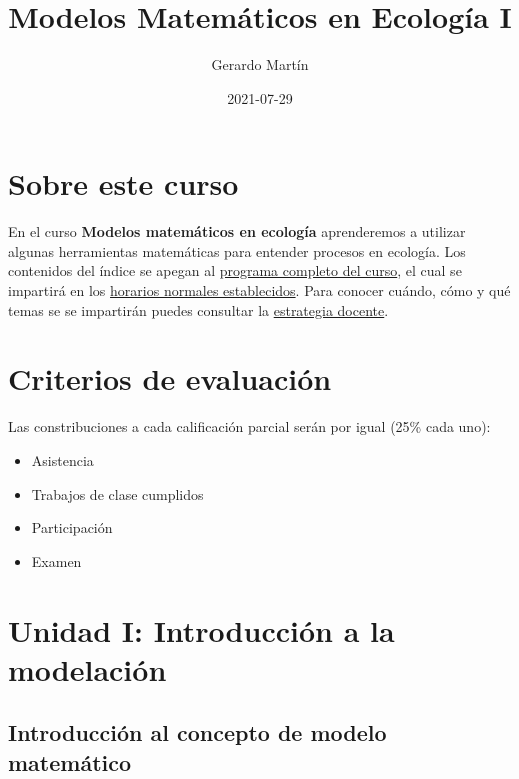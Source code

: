 \documentclass[
]{book}
\title{Modelos Matemáticos en Ecología I}
\author{Gerardo Martín}
\date{2021-07-29}
\providecommand{\tightlist}{%
  \setlength{\itemsep}{0pt}\setlength{\parskip}{0pt}}
\begin{document}
\maketitle

{
\setcounter{tocdepth}{1}
\tableofcontents
}
\hypertarget{sobre-este-curso}{%
\chapter{Sobre este curso}\label{sobre-este-curso}}

En el curso \textbf{Modelos matemáticos en ecología} aprenderemos a utilizar algunas herramientas matemáticas para entender procesos en ecología. Los contenidos del índice se apegan al \href{Programa-curso.pdf}{programa completo del curso}, el cual se impartirá en los \href{Horario.pdf}{horarios normales establecidos}. Para conocer cuándo, cómo y qué temas se se impartirán puedes consultar la \href{Estrategia-docente.pdf}{estrategia docente}.

\hypertarget{criterios-de-evaluaciuxf3n}{%
\chapter{Criterios de evaluación}\label{criterios-de-evaluaciuxf3n}}

Las constribuciones a cada calificación parcial serán por igual (25\% cada uno):

\begin{itemize}
\tightlist
\item
  Asistencia
\item
  Trabajos de clase cumplidos
\item
  Participación
\item
  Examen
\end{itemize}

\hypertarget{unidad-i-introducciuxf3n-a-la-modelaciuxf3n}{%
\chapter{Unidad I: Introducción a la modelación}\label{unidad-i-introducciuxf3n-a-la-modelaciuxf3n}}

\hypertarget{introducciuxf3n-al-concepto-de-modelo-matemuxe1tico}{%
\section{Introducción al concepto de modelo matemático}\label{introducciuxf3n-al-concepto-de-modelo-matemuxe1tico}}
\end{document}
